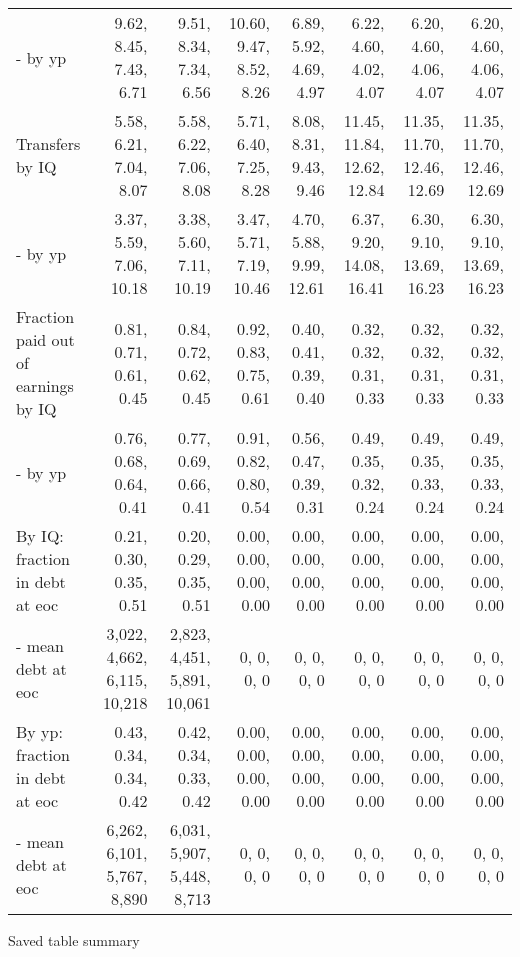 \begin{tabular}{lrrrrrrr}
- by yp & 9.62, 8.45, 7.43, 6.71  & 9.51, 8.34, 7.34, 6.56  & 10.60, 9.47, 8.52, 8.26  & 6.89, 5.92, 4.69, 4.97  & 6.22, 4.60, 4.02, 4.07  & 6.20, 4.60, 4.06, 4.07  & 6.20, 4.60, 4.06, 4.07  \\ 
Transfers by IQ & 5.58, 6.21, 7.04, 8.07  & 5.58, 6.22, 7.06, 8.08  & 5.71, 6.40, 7.25, 8.28  & 8.08, 8.31, 9.43, 9.46  & 11.45, 11.84, 12.62, 12.84  & 11.35, 11.70, 12.46, 12.69  & 11.35, 11.70, 12.46, 12.69  \\ 
- by yp & 3.37, 5.59, 7.06, 10.18  & 3.38, 5.60, 7.11, 10.19  & 3.47, 5.71, 7.19, 10.46  & 4.70, 5.88, 9.99, 12.61  & 6.37, 9.20, 14.08, 16.41  & 6.30, 9.10, 13.69, 16.23  & 6.30, 9.10, 13.69, 16.23  \\ 
Fraction paid out of earnings by IQ & 0.81, 0.71, 0.61, 0.45  & 0.84, 0.72, 0.62, 0.45  & 0.92, 0.83, 0.75, 0.61  & 0.40, 0.41, 0.39, 0.40  & 0.32, 0.32, 0.31, 0.33  & 0.32, 0.32, 0.31, 0.33  & 0.32, 0.32, 0.31, 0.33  \\ 
- by yp & 0.76, 0.68, 0.64, 0.41  & 0.77, 0.69, 0.66, 0.41  & 0.91, 0.82, 0.80, 0.54  & 0.56, 0.47, 0.39, 0.31  & 0.49, 0.35, 0.32, 0.24  & 0.49, 0.35, 0.33, 0.24  & 0.49, 0.35, 0.33, 0.24  \\ 
By IQ: fraction in debt at eoc & 0.21, 0.30, 0.35, 0.51  & 0.20, 0.29, 0.35, 0.51  & 0.00, 0.00, 0.00, 0.00  & 0.00, 0.00, 0.00, 0.00  & 0.00, 0.00, 0.00, 0.00  & 0.00, 0.00, 0.00, 0.00  & 0.00, 0.00, 0.00, 0.00  \\ 
- mean debt at eoc & 3,022, 4,662, 6,115, 10,218  & 2,823, 4,451, 5,891, 10,061  & 0, 0, 0, 0  & 0, 0, 0, 0  & 0, 0, 0, 0  & 0, 0, 0, 0  & 0, 0, 0, 0  \\ 
By yp: fraction in debt at eoc & 0.43, 0.34, 0.34, 0.42  & 0.42, 0.34, 0.33, 0.42  & 0.00, 0.00, 0.00, 0.00  & 0.00, 0.00, 0.00, 0.00  & 0.00, 0.00, 0.00, 0.00  & 0.00, 0.00, 0.00, 0.00  & 0.00, 0.00, 0.00, 0.00  \\ 
- mean debt at eoc & 6,262, 6,101, 5,767, 8,890  & 6,031, 5,907, 5,448, 8,713  & 0, 0, 0, 0  & 0, 0, 0, 0  & 0, 0, 0, 0  & 0, 0, 0, 0  & 0, 0, 0, 0  \\ 
\hline
\end{tabular}%
Saved table summary

